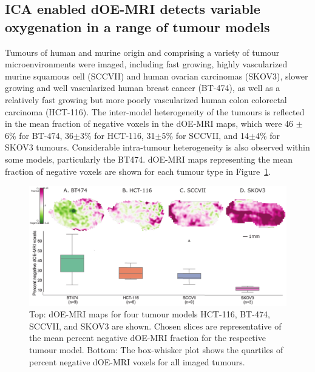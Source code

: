 \subsection{ICA enabled \acs{dOE-MRI} detects variable oxygenation in a range of tumour models}
\label{sec:rangeModels}
Tumours of human and murine origin and comprising a variety of tumour microenvironments were imaged, including fast growing, highly vascularized murine squamous cell (SCCVII) and human ovarian carcinomas (SKOV3), slower growing and well vascularized human breast cancer (BT-474), as well as a relatively fast growing but more poorly vascularized human colon colorectal carcinoma (HCT-116).
The inter-model heterogeneity of the tumours is reflected in the mean fraction of negative voxels in the \acs{dOE-MRI} maps, which were 46 $\pm$ 6\% for BT-474, 36$\pm$3\% for HCT-116, 31$\pm$5\% for SCCVII, and 14$\pm$4\% for SKOV3 tumours. 
Considerable intra-tumour heterogeneity is also observed within some models, particularly the BT474.
\acs{dOE-MRI} maps representing the mean fraction of negative voxels are shown for each tumour type in Figure~\ref{versatile}.
\begin{figure}[htbp]
   \centering
   \includegraphics[width=\textwidth]{oemri_thesis1/oemri_thesis1-images/fig2_versatile.pdf} %
   \caption{Top: \acs{dOE-MRI} maps for four tumour models HCT-116, BT-474, SCCVII, and SKOV3 are shown. Chosen slices are representative of the mean percent negative \acs{dOE-MRI} fraction for the respective tumour model.
Bottom: The box-whisker plot shows the quartiles of percent negative \acs{dOE-MRI} voxels for all imaged tumours.
\label{versatile}}
\end{figure}


